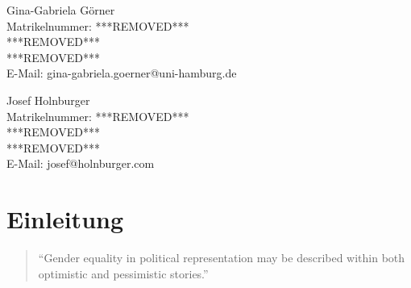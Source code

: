\documentclass[12pt, 
    twoside=false, 
    bibliography=totoc, 
    numbers=endperiod, 
    headings=normal, 
    toc=chapterentrydotfill
    ]{scrbook}
\begin{document}
\begin{titlepage}
	\begin{minipage}[t]{0.48\textwidth}
    \flushleft 
    Gina-Gabriela Görner \\
    Matrikelnummer: ***REMOVED*** \\
    ***REMOVED*** \vspace{0.1cm} \\ 
	***REMOVED*** \vspace{0.1cm}  \\
	E-Mail: gina-gabriela.goerner@uni-hamburg.de \\
    \end{minipage}
    \begin{minipage}[t]{0.48\textwidth}
	\flushleft
	Josef Holnburger \\
	Matrikelnummer: ***REMOVED*** \\
	***REMOVED*** \vspace{0.1cm} \\
	***REMOVED*** \vspace{0.1cm} \\
	E-Mail: josef@holnburger.com \\
    \end{minipage}

\end{titlepage}


\tableofcontents
\thispagestyle{empty}

\frontmatter

\listoffigures
{}
\vspace*{24pt}
{\let\clearpage\relax \listoftables}	

\mainmatter



\chapter{Einleitung}\label{Einleitung} 

\begin{quote}
    \enquote{Gender equality in political representation may be described within both optimistic and pessimistic stories.} \parencite[149]{celis_2018}
\end{quote}
\end{document}
